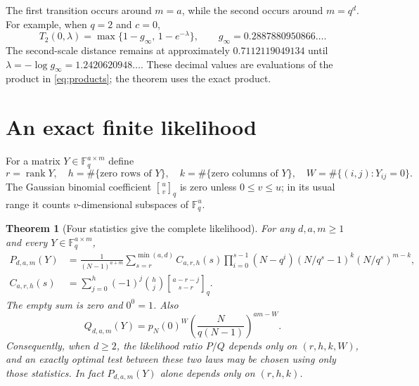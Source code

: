 \documentclass[11pt]{article}
\newtheorem{theorem}{Theorem}[section]
\theoremstyle{remark}\newtheorem{remark}[theorem]{Remark}
\newcommand{\F}{\mathbb F_q}
\newcommand{\rank}{\operatorname{rank}}
\newcommand{\qb}[2]{\genfrac{[}{]}{0pt}{}{#1}{#2}_q}
\begin{document}
The first transition occurs around $m=a$, while the second occurs around $m=q^d$. For example, when $q=2$ and $c=0$,
\begin{equation}\label{eq:square}
 T_2(0,\lambda)=\max\{1-g_\infty,\,1-e^{-\lambda}\},
 \qquad g_\infty=0.2887880950866\ldots.
\end{equation}
The second-scale distance remains at approximately $0.7112119049134$ until $\lambda=-\log g_\infty=1.2420620948\ldots$. These decimal values are evaluations of the product in \eqref{eq:products}; the theorem uses the exact product.

\section{An exact finite likelihood}
For a matrix $Y\in\F^{a\times m}$ define
\[
 r=\rank Y,\quad h=\#\{\text{zero rows of }Y\},\quad
 k=\#\{\text{zero columns of }Y\},\quad
 W=\#\{(i,j):Y_{ij}=0\}.
\]
The Gaussian binomial coefficient $\qb uv$ is zero unless $0\le v\le u$; in its usual range it counts $v$-dimensional subspaces of $\F^u$.

\begin{theorem}[Four statistics give the complete likelihood]\label{thm:exact}
For any $d,a,m\ge1$ and every $Y\in\F^{a\times m}$,
\begin{align}
 P_{d,a,m}(Y)
 &=\frac1{(N-1)^{a+m}}
 \sum_{s=r}^{\min(a,d)}C_{a,r,h}(s)
 \prod_{i=0}^{s-1}(N-q^i)
 (N/q^s-1)^k(N/q^s)^{m-k},\label{eq:exact}\\
 C_{a,r,h}(s)&=\sum_{j=0}^h(-1)^j\binom hj\qb{a-r-j}{s-r}.\label{eq:C}
\end{align}
The empty sum is zero and $0^0=1$. Also
\[
 Q_{d,a,m}(Y)=p_N(0)^W\left(\frac{N}{q(N-1)}\right)^{am-W}.
\]
Consequently, when $d\ge2$, the likelihood ratio $P/Q$ depends only on $(r,h,k,W)$, and an exactly optimal test between these two laws may be chosen using only those statistics. In fact $P_{d,a,m}(Y)$ alone depends only on $(r,h,k)$.
\end{theorem}
\end{document}
